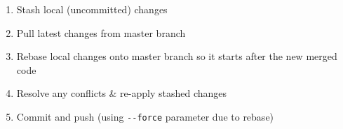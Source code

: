 \begin{enumerate}
\def\labelenumi{\arabic{enumi}.}
\item
  Stash local (uncommitted) changes

\begin{Shaded}
\begin{Highlighting}[]
\end{Highlighting}
\end{Shaded}
\item
  Pull latest changes from master branch

\begin{Shaded}
\begin{Highlighting}[]
\end{Highlighting}
\end{Shaded}
\item
  Rebase local changes onto master branch so it starts after the new
  merged code

\begin{Shaded}
\begin{Highlighting}[]
   \OperatorTok{\textless{}}\OperatorTok{\textgreater{}}\NormalTok{/}\OperatorTok{\textless{}}\OperatorTok{\textgreater{}}
\end{Highlighting}
\end{Shaded}
\item
  Resolve any conflicts \& re-apply stashed changes

\begin{Shaded}
\begin{Highlighting}[]
\end{Highlighting}
\end{Shaded}
\item
  Commit and push (using \texttt{-\/-force} parameter due to rebase)

\begin{Shaded}
\begin{Highlighting}[]
   \OperatorTok{\textless{}}\OperatorTok{\textgreater{}} \OperatorTok{\textless{}}\OperatorTok{\textgreater{}}
\end{Highlighting}
\end{Shaded}
\end{enumerate}

